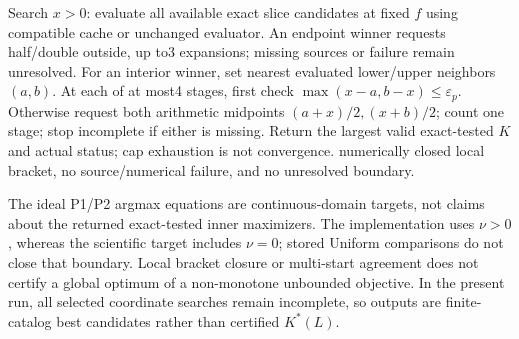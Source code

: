 \begin{algorithm}[t]
\begin{algorithmic}[1]
  \State Search $x>0$: evaluate all available exact slice candidates at fixed $f$ using compatible cache or unchanged evaluator.
  \State An endpoint winner requests half/double outside, up to3 expansions; missing sources or failure remain unresolved.
  \State For an interior winner, set nearest evaluated lower/upper neighbors $(a,b)$.
  \State At each of at most4 stages, first check $\max(x-a,b-x)\le\varepsilon_p$.
  \State Otherwise request both arithmetic midpoints $(a+x)/2,(x+b)/2$; count one stage; stop incomplete if either is missing.
  \State Return the largest valid exact-tested $K$ and actual status; cap exhaustion is not convergence.
\EndFunction
{}
  \State \Return numerically closed local bracket, no source/numerical failure, and no unresolved boundary.
\EndFunction
\end{algorithmic}
\end{algorithm}

The ideal P1/P2 argmax equations are continuous-domain targets, not claims about
the returned exact-tested inner maximizers. The implementation uses $\nu>0$,
whereas the scientific target includes $\nu=0$; stored Uniform comparisons do
not close that boundary. Local bracket closure or multi-start agreement does
not certify a global optimum of a non-monotone unbounded objective. In the
present run, all selected coordinate searches remain incomplete, so outputs
are finite-catalog best candidates rather than certified $K^*(L)$.
